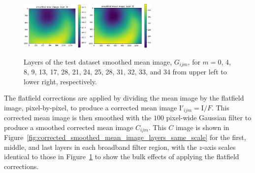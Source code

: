 \documentclass[letterpaper,11pt]{article}
\newcommand{\reffig}[1]{Figure~\ref{#1}}
\newcommand{\Iota}{\mathrm{I}}
\begin{document}
\begin{figure}[!ht]
\includegraphics[width=0.3\textwidth]{images/results/smoothed_mean_image_layers/smoothed_mean_image_layer_34}
\includegraphics[width=0.3\textwidth]{images/results/smoothed_mean_image_layers/smoothed_mean_image_layer_35}
\caption{\footnotesize Layers of the test dataset smoothed mean image, $G_{ijm}$, for $m=$0, 4, 8, 9, 13, 17, 28, 21, 24, 25, 28, 31, 32, 33, and 34 from upper left to lower right, respectively.}
\label{fig:uncorrected_mean_image_layers}
\end{figure}

The flatfield corrections are applied by dividing the mean image by the flatfield image, pixel-by-pixel, to produce a corrected mean image $\Iota'_{ijm}=\Iota/F$. This corrected mean image is then smoothed with the $100$ pixel-wide Gaussian filter to produce a smoothed corrected mean image $C_{ijm}$. This $C$ image is shown in \reffig{fig:corrected_smoothed_mean_image_layers_same_scale} for the first, middle, and last layers in each broadband filter region, with the $z$-axis scales identical to those in \reffig{fig:uncorrected_mean_image_layers} to show the bulk effects of applying the flatfield corrections.
\end{document}
